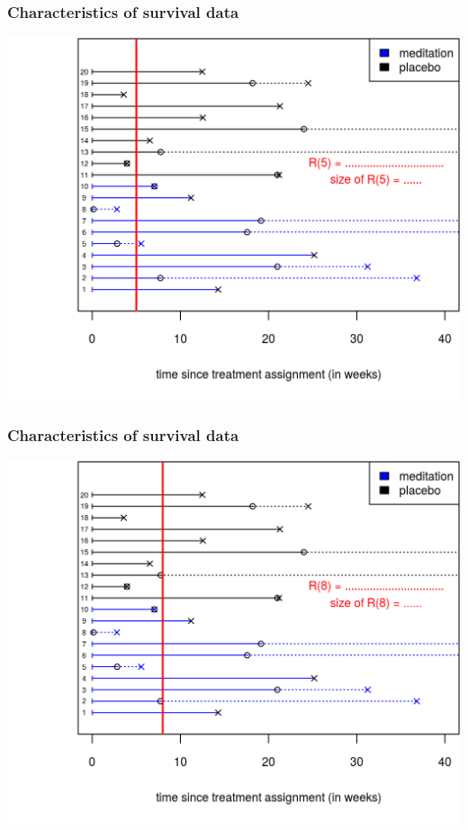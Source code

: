\documentclass[12pt, 
hyperref={colorlinks=true, linkcolor=blue, urlcolor=cyan},dvipsnames]{beamer}
\begin{document}
\begin{frame}
\frametitle{Characteristics of survival data}
\begin{center}
\includegraphics[height=0.8\textheight]{figs/risk_set_movie_2.png}
\end{center}
\end{frame}

\begin{frame}
\frametitle{Characteristics of survival data}
\begin{center}
\includegraphics[height=0.8\textheight]{figs/risk_set_movie_3.png}
\end{center}
\end{frame}
\end{document}
